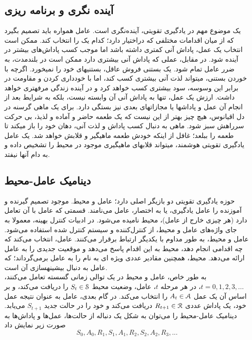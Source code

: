 \subsection{آینده نگری و برنامه ریزی}
یک موضوع مهم در یادگیری تقویتی، آینده‌نگری است. عامل همواره باید تصمیم بگیرد که از میان اقدامات مختلفی که دراختیار دارد؛ کدام یک را انتخاب کند. ممکن است انتخاب یک عمل، پاداش آنی کمتری داشته باشد اما موجب کسب پاداش‌های بیشتر در آینده شود. در مقابل، عملی که پاداش آنی بیشتری دارد ممکن است در بلند\nf مدت، به ضرر عامل تمام شود.  یک بستنی فروش عاقل، بستنی\nf های خود را نمی\nf خورد. اگرچه با خوردن بستنی، می\nf تواند لذت  آنی بیشتری کسب کند، اما با خودداری کردن و مقاومت در برابر این وسوسه، سود بیشتری کسب \nf خواهد کرد و در آینده زندگی مرفه\nf تری خواهد داشت.
ارزش یک عمل، تنها به پاداش آنی آن وابسته نیست، بلکه به شرایط بعد از انجام آن عمل و پاداش\nf ها یا مجازات\nf های بعدی نیز بستگی دارد. برای یک ماهی گرسنه در دل اقیانوس، هیچ چیز بهتر از این نیست که یک طعمه حاضر و آماده و لذیذ، بی حرکت سرراهش سبز شود. ماهی به دنبال کسب پاداش و لذت آنی، دهان خود را باز می\nf کند تا طعمه را ببلعد؛ غافل از این\nf که خودش طعمه ماهیگیر و قلابش خواهد شد. یک عامل یادگیری تقویتی هوشمند، می\nf تواند قلاب\nf های ماهیگیری موجود در محیط را تشخیص داده و به دام آن\nf ها نیفتد.



\subsection{دینامیک عامل-محیط}
حوزه یادگیری تقویتی  دو بازیگر اصلی دارد؛ عامل و محیط. موجود تصمیم گیرنده و آموزنده را عامل یادگیری، یا به اختصار، عامل می‌نامند. قسمتی که عامل با آن تعامل دارد (هر چیزی خارج از عامل)، محیط نامیده می‌شود. در ادبیات کنترل بهینه، معمولا به جای واژه‌های عامل و محیط، از  کنترل‌کننده 
و سیستم کنترل شده  استفاده می‌شود.
عامل و محیط، به طور مداوم با یکدیگر ارتباط برقرار می‌کنند. عامل، انتخاب می‌کند که چه اقدامی‌ انجام دهد، محیط به این اقدام پاسخ می‌دهد و موقعیت جدیدی را به عامل ارائه می‌دهد.
محیط، همچنین مقادیر عددی ویژه ای به نام  را به عامل برمی‌گرداند؛ که عامل به دنبال بیشینه\nf سازی آن است.
\\به طور خاص، عامل و محیط در یک توالی زمانی گسسته تعامل می‌کنند، 
$t = 0,1,2,3,...$،
در هر مرحله $t$، عامل، وضعیت محیط  
$S_t \in \EuScript{S}$
را دریافت می‌کند، و بر اساس آن یک عمل 
$A_t \in \EuScript{A}$
را انتخاب می‌کند. در گام بعدی، عامل به عنوان نتیجه عمل خود، یک پاداش عددی $R_{t+1} \in \EuScript{R}$ دریافت می‌کند و خود را در حالت جدید $S_{t+1}$ می‌یابد.
دینامیک عامل-محیط را می‌توان به شکل یک دنباله از حالت‌ها، عمل‌ها و پاداش‌ها به صورت زیر نمایش داد \cite{suttonbook}
$$S_0, A_0, R_1, S_1, A_1, R_2, S_2, A_2, R_3,...$$

